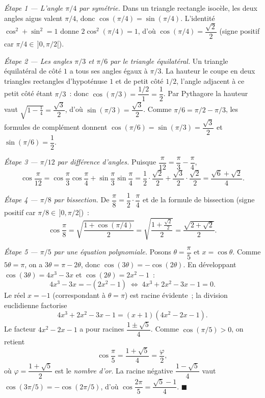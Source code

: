 \begin{mdframed}[style=proofbar]
  \textit{Étape 1 — L'angle $\pi/4$ par symétrie.}
  Dans un triangle rectangle isocèle, les deux angles aigus valent $\pi/4$,
  donc $\cos(\pi/4)=\sin(\pi/4)$. L'identité $\cos^2+\sin^2=1$ donne
  $2\cos^2(\pi/4)=1$, d'où $\cos(\pi/4)=\dfrac{\sqrt 2}{2}$ (signe positif car
  $\pi/4\in\,]0,\pi/2[$).

  \medskip
  \textit{Étape 2 — Les angles $\pi/3$ et $\pi/6$ par le triangle équilatéral.}
  Un triangle équilatéral de côté $1$ a tous ses angles égaux à $\pi/3$. La
  hauteur le coupe en deux triangles rectangles d'hypoténuse $1$ et de petit côté
  $1/2$, l'angle adjacent à ce petit côté étant $\pi/3$~: donc
  $\cos(\pi/3)=\dfrac{1/2}{1}=\dfrac{1}{2}$. Par Pythagore la hauteur vaut
  $\sqrt{1-\tfrac14}=\dfrac{\sqrt 3}{2}$, d'où $\sin(\pi/3)=\dfrac{\sqrt 3}{2}$.
  Comme $\pi/6=\pi/2-\pi/3$, les formules de complément donnent
  $\cos(\pi/6)=\sin(\pi/3)=\dfrac{\sqrt 3}{2}$ et $\sin(\pi/6)=\dfrac12$.

  \medskip
  \textit{Étape 3 — $\pi/12$ par différence d'angles.}
  Puisque $\dfrac{\pi}{12}=\dfrac{\pi}{3}-\dfrac{\pi}{4}$,
  \[
    \cos\frac{\pi}{12}
    =\cos\frac{\pi}{3}\cos\frac{\pi}{4}+\sin\frac{\pi}{3}\sin\frac{\pi}{4}
    =\frac12\cdot\frac{\sqrt2}{2}+\frac{\sqrt3}{2}\cdot\frac{\sqrt2}{2}
    =\frac{\sqrt 6+\sqrt 2}{4}.
  \]

  \medskip
  \textit{Étape 4 — $\pi/8$ par bissection.}
  De $\dfrac{\pi}{8}=\dfrac12\cdot\dfrac{\pi}{4}$ et de la formule de bissection
  (signe positif car $\pi/8\in\,]0,\pi/2[$)~:
  \[
    \cos\frac{\pi}{8}=\sqrt{\frac{1+\cos(\pi/4)}{2}}
    =\sqrt{\frac{1+\tfrac{\sqrt2}{2}}{2}}
    =\frac{\sqrt{2+\sqrt 2}}{2}.
  \]

  \medskip
  \textit{Étape 5 — $\pi/5$ par une équation polynomiale.}
  Posons $\theta=\dfrac{\pi}{5}$ et $x=\cos\theta$. Comme $5\theta=\pi$, on a
  $3\theta=\pi-2\theta$, donc $\cos(3\theta)=-\cos(2\theta)$. En développant
  $\cos(3\theta)=4x^3-3x$ et $\cos(2\theta)=2x^2-1$~:
  \[
    4x^3-3x=-(2x^2-1)
    \;\Longleftrightarrow\;
    4x^3+2x^2-3x-1=0.
  \]
  Le réel $x=-1$ (correspondant à $\theta=\pi$) est racine évidente~; la
  division euclidienne factorise
  \[
    4x^3+2x^2-3x-1=(x+1)(4x^2-2x-1).
  \]
  Le facteur $4x^2-2x-1$ a pour racines $\dfrac{1\pm\sqrt5}{4}$. Comme
  $\cos(\pi/5)>0$, on retient
  \[
    \cos\frac{\pi}{5}=\frac{1+\sqrt 5}{4}=\frac{\varphi}{2},
  \]
  où $\varphi=\dfrac{1+\sqrt5}{2}$ est le \emph{nombre d'or}. La racine négative
  $\dfrac{1-\sqrt5}{4}$ vaut $\cos(3\pi/5)=-\cos(2\pi/5)$, d'où
  $\cos\dfrac{2\pi}{5}=\dfrac{\sqrt5-1}{4}$.
  \hfill$\blacksquare$
\end{mdframed}

